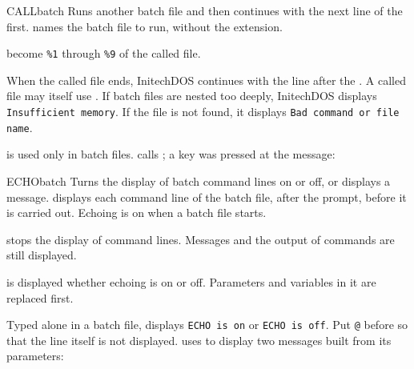 \begin{DosEntry}{CALL}{}{batch}
\Purpose Runs another batch file and then continues with the next line of
the first.
\Format {}
\Remarks
{} names the batch file to run, without the extension.

 become \texttt{\%1} through \texttt{\%9} of the called
file.

When the called file ends, InitechDOS continues with the line after the
.  A called file may itself use .  If batch files are
nested too deeply, InitechDOS displays \texttt{Insufficient memory}.  If
the file is not found, it displays \texttt{Bad command or file name}.

 is used only in batch files.
\Example
{} calls ; a key was pressed at the
 message:
\end{DosEntry}

\begin{DosEntry}{ECHO}{}{batch}
\Purpose Turns the display of batch command lines on or off, or displays a
message.
\Format {}
\Remarks
{} displays each command line of the batch file, after the prompt,
before it is carried out.  Echoing is on when a batch file starts.

 stops the display of command lines.  Messages and the output of
commands are still displayed.

 is displayed whether echoing is on or off.  Parameters and
variables in it are replaced first.

Typed alone in a batch file,  displays \texttt{ECHO is on} or
\texttt{ECHO is off}.  Put \texttt{@} before  so that the
 line itself is not displayed.
\Example
{} uses  to display two messages built from its
parameters:
\end{DosEntry}

